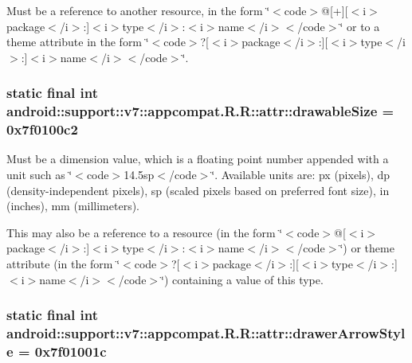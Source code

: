 Must be a reference to another resource, in the form \char`\"{}$<$code$>$@\mbox{[}+\mbox{]}\mbox{[}$<$i$>$package$<$/i$>$:\mbox{]}$<$i$>$type$<$/i$>$:$<$i$>$name$<$/i$>$$<$/code$>$\char`\"{} or to a theme attribute in the form \char`\"{}$<$code$>$?\mbox{[}$<$i$>$package$<$/i$>$:\mbox{]}\mbox{[}$<$i$>$type$<$/i$>$:\mbox{]}$<$i$>$name$<$/i$>$$<$/code$>$\char`\"{}. \hypertarget{classandroid_1_1support_1_1v7_1_1appcompat_1_1_r_1_1attr_7fe82eb5c03945592aeb9c4992bc7256}{
\subsubsection[{drawableSize}]{\setlength{\rightskip}{0pt plus 5cm}static final int android::support::v7::appcompat.R.R::attr::drawableSize = 0x7f0100c2}}
\label{classandroid_1_1support_1_1v7_1_1appcompat_1_1_r_1_1attr_7fe82eb5c03945592aeb9c4992bc7256}


Must be a dimension value, which is a floating point number appended with a unit such as \char`\"{}$<$code$>$14.5sp$<$/code$>$\char`\"{}. Available units are: px (pixels), dp (density-independent pixels), sp (scaled pixels based on preferred font size), in (inches), mm (millimeters). 

This may also be a reference to a resource (in the form \char`\"{}$<$code$>$@\mbox{[}$<$i$>$package$<$/i$>$:\mbox{]}$<$i$>$type$<$/i$>$:$<$i$>$name$<$/i$>$$<$/code$>$\char`\"{}) or theme attribute (in the form \char`\"{}$<$code$>$?\mbox{[}$<$i$>$package$<$/i$>$:\mbox{]}\mbox{[}$<$i$>$type$<$/i$>$:\mbox{]}$<$i$>$name$<$/i$>$$<$/code$>$\char`\"{}) containing a value of this type. \hypertarget{classandroid_1_1support_1_1v7_1_1appcompat_1_1_r_1_1attr_1e11159150104ac355b55b654a2a7266}{
\subsubsection[{drawerArrowStyle}]{\setlength{\rightskip}{0pt plus 5cm}static final int android::support::v7::appcompat.R.R::attr::drawerArrowStyle = 0x7f01001c}}
\label{classandroid_1_1support_1_1v7_1_1appcompat_1_1_r_1_1attr_1e11159150104ac355b55b654a2a7266}


